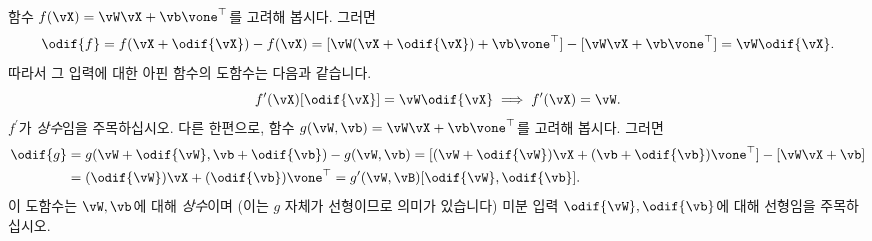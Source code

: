 \documentclass[../../book-main_ko.tex]{subfiles}
\begin{document}
\begin{example}
    함수 \(f(\vX) = \vW\vX + \vb\vone^{\top}\)를 고려해 봅시다. 그러면
    \begin{equation}
        \odif{f} = f(\vX + \odif{\vX}) - f(\vX) = [\vW(\vX + \odif{\vX}) + \vb\vone^{\top}] - [\vW \vX + \vb \vone^{\top}] = \vW\odif{\vX}.
    \end{equation}
    따라서 그 입력에 대한 아핀 함수의 도함수는 다음과 같습니다.
    \begin{equation}
        f^{\prime}(\vX)[\odif{\vX}] = \vW\odif{\vX} \implies f^{\prime}(\vX) = \vW.
    \end{equation}
    \(f^{\prime}\)가 \textit{상수}임을 주목하십시오. 다른 한편으로, 함수 \(g(\vW, \vb) = \vW\vX + \vb\vone^{\top}\)를 고려해 봅시다. 그러면
    \begin{align}
        \odif{g}
        &= g(\vW + \odif{\vW}, \vb + \odif{\vb}) - g(\vW, \vb) = [(\vW + \odif{\vW})\vX + (\vb + \odif{\vb})\vone^{\top}] - [\vW\vX + \vb] \\
        &= (\odif{\vW})\vX + (\odif{\vb})\vone^{\top} = g^{\prime}(\vW, \vB)[\odif{\vW}, \odif{\vb}].
    \end{align}
    이 도함수는 \(\vW, \vb\)에 대해 \textit{상수}이며 (이는 \(g\) 자체가 선형이므로 의미가 있습니다) 미분 입력 \(\odif{\vW}, \odif{\vb}\)에 대해 선형임을 주목하십시오.
\end{example}
\end{document}
